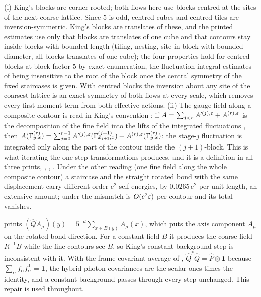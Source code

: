 \begin{convention}\label{rot:conv:C}
\textup{(i)} King's blocks are corner-rooted; both flows here use blocks centred at the sites of the next coarse lattice. Since $5$ is odd, centred cubes and centred tiles are inversion-symmetric. King's blocks are translates of these, and the printed estimates use only that blocks are translates of one cube and that contours stay inside blocks with bounded length (tiling, nesting, site in block with bounded diameter, all blocks translates of one cube); the four properties hold for centred blocks at block factor $5$ by exact enumeration, the fluctuation-integral estimates of \cite{Ba1,Ba2,Ba3,Ba4} being insensitive to the root of the block once the central symmetry of the fixed staircases is given. With centred blocks the inversion about any site of the coarsest lattice is an exact symmetry of both flows at every scale, which removes every first-moment term from both effective actions. \textup{(ii)} The gauge field along a composite contour is read in King's convention \cite[(2.19)]{K1}: if $A=\sum_{j<r}A'^{(j),\varepsilon}+A^{(r),\varepsilon}$ is the decomposition of the fine field into the lifts of the integrated fluctuations \cite[(2.18)]{K1}, then $A(\Gamma^{(r)}_{y,x})=\sum_{j=0}^{r-1}A'^{(j),\varepsilon}(\Gamma^{(j+1)}_{x_{j+1},x})+A^{(r),\varepsilon}(\Gamma^{(r)}_{y,x})$: the stage-$j$ fluctuation is integrated only along the part of the contour inside the $(j+1)$-block. This is what iterating the one-step transformations produces, and it is a definition in all three prints, \cite[(2.19)]{K1}, \cite[(3.34)]{Ba1}, \cite[(1.3)]{Ba3}. Under the other reading (one fine field along the whole composite contour) a staircase and the straight rotated bond with the same displacement carry different order-$e^2$ self-energies, by $0.0265\,e^2$ per unit length, an extensive amount; under \cite[(2.19)]{K1} the mismatch is $O(e^2\varepsilon)$ per contour and its total vanishes.
\end{convention}

\begin{remark}\label{rot:rem:frameav}
\cite[(4.3)]{K2} prints $(\hat QA_\mu)(y)=5^{-d}\sum_{x\in B(y)}A_\mu(x)$, which puts the axis component $A_\mu$ on the rotated bond direction. For a constant field $B$ it produces the coarse field $R^{-1}B$ while the fine contours see $B$, so King's constant-background step \cite[(3.43)--(3.46)]{K1} is inconsistent with it. With the frame-covariant average of , $\hat Q^*\hat Q=\hat P\otimes\mathbf 1$ because $\sum_\alpha f_\alpha f_\alpha^{\mathrm T}=\mathbf 1$, the hybrid photon covariances are the scalar ones times the identity, and a constant background passes through every step unchanged. This repair is used throughout.
\end{remark}

